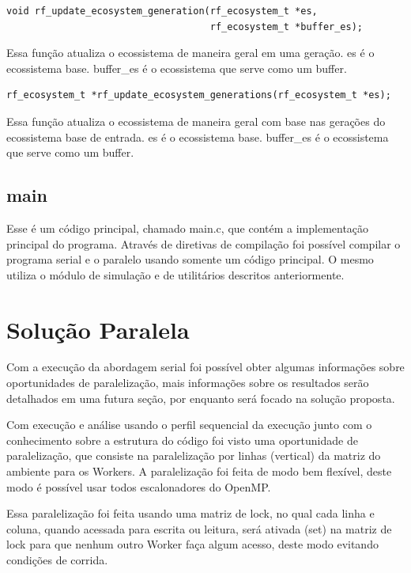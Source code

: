 \documentclass{article}
\begin{document}
\begin{verbatim}
void rf_update_ecosystem_generation(rf_ecosystem_t *es,
                                    rf_ecosystem_t *buffer_es);
      \end{verbatim}

Essa função atualiza o ecossistema de maneira geral em uma geração.
es é o ecossistema base.
buffer\_es é o ecossistema que serve como um buffer.


\begin{verbatim}
rf_ecosystem_t *rf_update_ecosystem_generations(rf_ecosystem_t *es);
      \end{verbatim}


Essa função atualiza o ecossistema de maneira geral com base nas gerações do ecossistema base de entrada.
es é o ecossistema base.
buffer\_es é o ecossistema que serve como um buffer.


\subsection{main}

Esse é um código principal, chamado main.c, que contém a implementação principal do programa. Através de diretivas de compilação foi possível compilar o programa serial e o paralelo usando somente um código principal. O mesmo utiliza o módulo de simulação e de utilitários descritos anteriormente.

\section{Solução Paralela}

Com a execução da abordagem serial foi possível obter algumas informações sobre oportunidades de paralelização, mais informações sobre os resultados serão detalhados em uma futura seção, por enquanto será focado na solução proposta.

Com execução e análise usando o perfil sequencial da execução junto com o conhecimento sobre a estrutura do código foi visto uma oportunidade de paralelização, que consiste na paralelização por linhas (vertical) da matriz do ambiente para os Workers. A paralelização foi feita de modo bem flexível, deste modo é possível usar todos escalonadores do OpenMP.

Essa paralelização foi feita usando uma matriz de lock, no qual cada linha e coluna, quando acessada para escrita ou leitura, será ativada (set) na matriz de lock para que nenhum outro Worker faça algum acesso, deste modo evitando condições de corrida.
\end{document}
